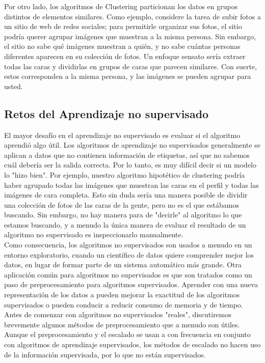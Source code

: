 Por otro lado, los algoritmos de Clustering particionan  los datos en grupos distintos de elementos similares. Como ejemplo, considere la tarea de subir fotos a un sitio de web de redes sociales; para permitirle  organizar sus fotos, el sitio podría querer agrupar  imágenes que muestran a la misma persona. Sin embargo, el sitio no sabe qué imágenes muestran a quién, y no sabe cuántas personas diferentes aparecen en su colección de fotos. Un enfoque sensato sería extraer todas las caras y dividirlas en grupos de caras que parecen similares. Con suerte, estos corresponden a la misma persona, y las imágenes se pueden agrupar para usted.

\subsection{Retos del Aprendizaje no supervisado}


El mayor  desafío  en el aprendizaje no supervisado es evaluar si el algoritmo aprendió algo útil. Los algoritmos de aprendizaje no supervisados generalmente se aplican a datos que no contienen información 
de etiquetas, así que no sabemos cuál debería ser la salida correcta.   Por lo tanto, es muy difícil 
decir si un modelo lo  "hizo bien".{ }  Por ejemplo, nuestro algoritmo hipotético de clustering  podría haber agrupado todas las imágenes que muestran las caras en el perfil y todas las imágenes de cara completa.   Esto  sin duda sería  una manera posible de dividir una colección de fotos de las caras de la gente, 
pero no es el que estábamos buscando. Sin embargo, no hay manera para  de "decirle{}"{ } al algoritmo lo 
que estamos buscando, y a menudo la única manera de evaluar el resultado de un algoritmo no supervisado
es inspeccionarlo  manualmente.\\


Como consecuencia, los algoritmos no supervisados son usados a menudo en un entorno exploratorio,
cuando un científico de datos quiere comprender mejor los datos, en lugar de formar parte de un sistema automático más grande.  Otra aplicación común para algoritmos no supervisados es que son tratados como un paso de preprocesamiento para algoritmos supervisados. Aprender con una nueva representación de los datos a  pueden mejorar la exactitud de los algoritmos supervisados o pueden conducir a reducir consumo de memoria y
 de tiempo.\\


Antes de comenzar con algoritmos  no supervisados  "{}reales"{}, discutiremos brevemente algunos
métodos de preprocesamiento que a menudo son útiles. Aunque el preprocesamiento y el escalado se usan a con frecuencia en conjunto con algoritmos de aprendizaje supervisados, los métodos de escalado no hacen uso de la información supervisada, por lo que no están supervisados.

